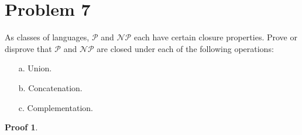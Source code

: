 \documentclass[a4paper,UTF8]{ctexart}
\theoremstyle{definition}
\newtheorem*{prove}{Proof}
\begin{document}
\section*{Problem 7}
As classes of languages, $\mathcal{P}$ and $\mathcal{NP}$ each have certain closure properties. Prove or disprove that $\mathcal{P}$ and $\mathcal{NP}$ are closed under each of the following operations:
\begin{enumerate}
  \item[a.] Union.
  \item[b.] Concatenation.
  \item[c.] Complementation.
\end{enumerate}
\begin{prove}
\end{prove}
\end{document}
